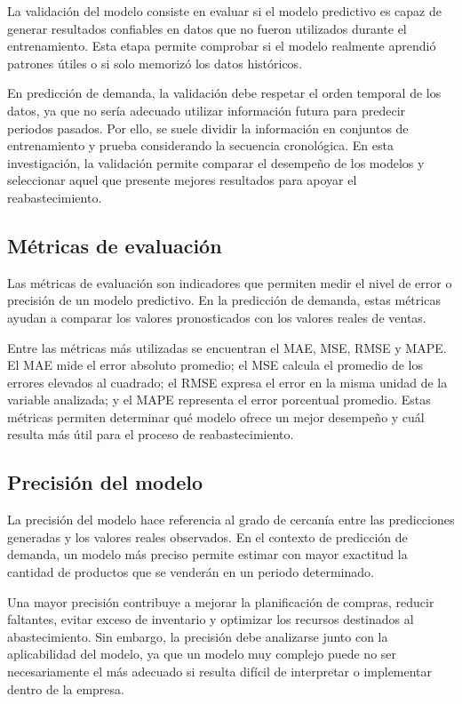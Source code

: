 La validación del modelo consiste en evaluar si el modelo predictivo es capaz de generar resultados confiables en datos que no fueron utilizados durante el entrenamiento. Esta etapa permite comprobar si el modelo realmente aprendió patrones útiles o si solo memorizó los datos históricos.

En predicción de demanda, la validación debe respetar el orden temporal de los datos, ya que no sería adecuado utilizar información futura para predecir periodos pasados. Por ello, se suele dividir la información en conjuntos de entrenamiento y prueba considerando la secuencia cronológica. En esta investigación, la validación permite comparar el desempeño de los modelos y seleccionar aquel que presente mejores resultados para apoyar el reabastecimiento.

\subsection{Métricas de evaluación}

Las métricas de evaluación son indicadores que permiten medir el nivel de error o precisión de un modelo predictivo. En la predicción de demanda, estas métricas ayudan a comparar los valores pronosticados con los valores reales de ventas.

Entre las métricas más utilizadas se encuentran el MAE, MSE, RMSE y MAPE. El MAE mide el error absoluto promedio; el MSE calcula el promedio de los errores elevados al cuadrado; el RMSE expresa el error en la misma unidad de la variable analizada; y el MAPE representa el error porcentual promedio. Estas métricas permiten determinar qué modelo ofrece un mejor desempeño y cuál resulta más útil para el proceso de reabastecimiento.

\subsection{Precisión del modelo}

La precisión del modelo hace referencia al grado de cercanía entre las predicciones generadas y los valores reales observados. En el contexto de predicción de demanda, un modelo más preciso permite estimar con mayor exactitud la cantidad de productos que se venderán en un periodo determinado.

Una mayor precisión contribuye a mejorar la planificación de compras, reducir faltantes, evitar exceso de inventario y optimizar los recursos destinados al abastecimiento. Sin embargo, la precisión debe analizarse junto con la aplicabilidad del modelo, ya que un modelo muy complejo puede no ser necesariamente el más adecuado si resulta difícil de interpretar o implementar dentro de la empresa.


